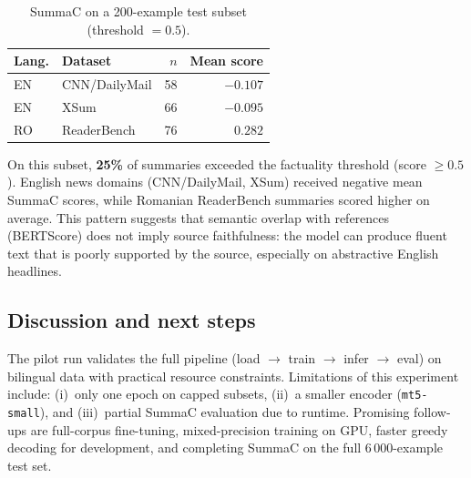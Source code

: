 \documentclass[11pt,a4paper]{article}
\begin{document}
\begin{table}[h]
  \centering
  \small
  \caption{SummaC on a 200-example test subset (threshold $=0.5$).}
  \label{tab:summac}
  \begin{tabular}{@{}llrr@{}}
    \toprule
    Lang. & Dataset & $n$ & Mean score \\
    \midrule
    EN & CNN/DailyMail & 58 & $-0.107$ \\
    EN & XSum & 66 & $-0.095$ \\
    RO & ReaderBench & 76 & $0.282$ \\
    \bottomrule
  \end{tabular}
\end{table}

\noindent
On this subset, \textbf{25\%} of summaries exceeded the factuality threshold (score $\geq 0.5$).
English news domains (CNN/DailyMail, XSum) received negative mean SummaC scores, while Romanian ReaderBench summaries scored higher on average.
This pattern suggests that semantic overlap with references (BERTScore) does not imply source faithfulness: the model can produce fluent text that is poorly supported by the source, especially on abstractive English headlines.

\subsection{Discussion and next steps}

The pilot run validates the full pipeline (load $\rightarrow$ train $\rightarrow$ infer $\rightarrow$ eval) on bilingual data with practical resource constraints.
Limitations of this experiment include: (i)~only one epoch on capped subsets, (ii)~a smaller encoder (\texttt{mt5-small}), and (iii)~partial SummaC evaluation due to runtime.
Promising follow-ups are full-corpus fine-tuning, mixed-precision training on GPU, faster greedy decoding for development, and completing SummaC on the full 6\,000-example test set.
\end{document}
